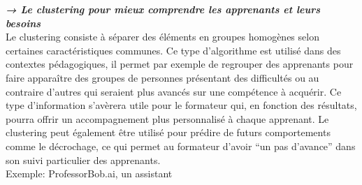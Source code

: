 	\textbf{\textit{→ Le clustering pour mieux comprendre les apprenants et leurs besoins }} \\
	Le clustering consiste à séparer des éléments en groupes homogènes selon certaines caractéristiques communes. Ce type d’algorithme est utilisé dans des contextes pédagogiques, il permet par exemple de regrouper des apprenants pour faire apparaître des groupes de personnes présentant des difficultés ou au contraire d’autres qui seraient plus avancés sur une compétence à acquérir. Ce type d’information s’avèrera utile pour le formateur qui, en fonction des résultats, pourra offrir un accompagnement plus personnalisé à chaque apprenant. Le clustering peut également être utilisé pour prédire de futurs comportements comme le décrochage, ce qui permet au formateur d’avoir “un pas d’avance” dans son suivi particulier des apprenants.\\
	Exemple: ProfessorBob.ai, un assistant

